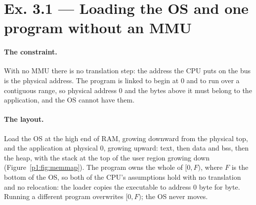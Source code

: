 \section*{Ex. 3.1 --- Loading the OS and one program without an MMU}

\paragraph{The constraint.}
With no MMU there is no translation step: the address the CPU puts on the bus is the
physical address. The program is linked to begin at 0 and to run over a contiguous
range, so physical address 0 and the bytes above it must belong to the application, and
the OS cannot have them.

\paragraph{The layout.}
Load the OS at the high end of RAM, growing downward from the physical top, and the
application at physical 0, growing upward: text, then data and bss, then the heap, with
the stack at the top of the user region growing down (Figure~\ref{p1:fig:memmap}). The
program owns the whole of $[0,F)$, where $F$ is the bottom of the OS, so both of the
CPU's assumptions hold with no translation and no relocation: the loader copies the
executable to address 0 byte for byte. Running a different program overwrites $[0,F)$;
the OS never moves.

